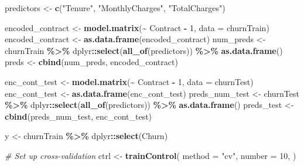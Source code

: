\documentclass[
]{article}
\newenvironment{Shaded}{\begin{snugshade}}{\end{snugshade}}
\newcommand{\AttributeTok}[1]{\textcolor[rgb]{0.13,0.29,0.53}{#1}}
\newcommand{\CommentTok}[1]{\textcolor[rgb]{0.56,0.35,0.01}{\textit{#1}}}
\newcommand{\DecValTok}[1]{\textcolor[rgb]{0.00,0.00,0.81}{#1}}
\newcommand{\FunctionTok}[1]{\textcolor[rgb]{0.13,0.29,0.53}{\textbf{#1}}}
\newcommand{\NormalTok}[1]{#1}
\newcommand{\OtherTok}[1]{\textcolor[rgb]{0.56,0.35,0.01}{#1}}
\newcommand{\SpecialCharTok}[1]{\textcolor[rgb]{0.81,0.36,0.00}{\textbf{#1}}}
\newcommand{\StringTok}[1]{\textcolor[rgb]{0.31,0.60,0.02}{#1}}
\begin{document}
\begin{Shaded}
\begin{Highlighting}[]
\NormalTok{predictors }\OtherTok{\textless{}{-}} \FunctionTok{c}\NormalTok{(}\StringTok{"Tenure"}\NormalTok{, }\StringTok{"MonthlyCharges"}\NormalTok{, }\StringTok{"TotalCharges"}\NormalTok{)}

\NormalTok{encoded\_contract }\OtherTok{\textless{}{-}} \FunctionTok{model.matrix}\NormalTok{(}\SpecialCharTok{\textasciitilde{}}\NormalTok{ Contract }\SpecialCharTok{{-}} \DecValTok{1}\NormalTok{, }\AttributeTok{data =}\NormalTok{ churnTrain)}
\NormalTok{encoded\_contract }\OtherTok{\textless{}{-}} \FunctionTok{as.data.frame}\NormalTok{(encoded\_contract)}
\NormalTok{num\_preds }\OtherTok{\textless{}{-}}\NormalTok{ churnTrain  }\SpecialCharTok{\%\textgreater{}\%}\NormalTok{ dplyr}\SpecialCharTok{::}\FunctionTok{select}\NormalTok{(}\FunctionTok{all\_of}\NormalTok{(predictors)) }\SpecialCharTok{\%\textgreater{}\%} \FunctionTok{as.data.frame}\NormalTok{()}
\NormalTok{preds }\OtherTok{\textless{}{-}} \FunctionTok{cbind}\NormalTok{(num\_preds, encoded\_contract)}

\NormalTok{enc\_cont\_test }\OtherTok{\textless{}{-}} \FunctionTok{model.matrix}\NormalTok{(}\SpecialCharTok{\textasciitilde{}}\NormalTok{ Contract }\SpecialCharTok{{-}} \DecValTok{1}\NormalTok{, }\AttributeTok{data =}\NormalTok{ churnTest)}
\NormalTok{enc\_cont\_test }\OtherTok{\textless{}{-}} \FunctionTok{as.data.frame}\NormalTok{(enc\_cont\_test)}
\NormalTok{preds\_num\_test }\OtherTok{\textless{}{-}}\NormalTok{ churnTest  }\SpecialCharTok{\%\textgreater{}\%}\NormalTok{ dplyr}\SpecialCharTok{::}\FunctionTok{select}\NormalTok{(}\FunctionTok{all\_of}\NormalTok{(predictors)) }\SpecialCharTok{\%\textgreater{}\%} \FunctionTok{as.data.frame}\NormalTok{()}
\NormalTok{preds\_test }\OtherTok{\textless{}{-}} \FunctionTok{cbind}\NormalTok{(preds\_num\_test, enc\_cont\_test)}


\NormalTok{y }\OtherTok{\textless{}{-}}\NormalTok{ churnTrain  }\SpecialCharTok{\%\textgreater{}\%}\NormalTok{ dplyr}\SpecialCharTok{::}\FunctionTok{select}\NormalTok{(Churn)}

\CommentTok{\# Set up cross{-}validation}
\NormalTok{ctrl }\OtherTok{\textless{}{-}} \FunctionTok{trainControl}\NormalTok{(}
  \AttributeTok{method =} \StringTok{"cv"}\NormalTok{,}
  \AttributeTok{number =} \DecValTok{10}\NormalTok{,}
\NormalTok{)}


\end{Highlighting}
\end{Shaded}
\end{document}

